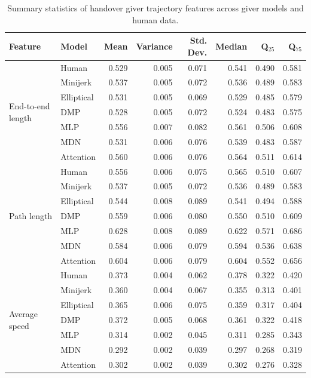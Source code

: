 \documentclass[journal]{IEEEtran}
\begin{document}
\begin{table}[th]
\centering
\caption{Summary statistics of handover giver trajectory features across giver models and human data.}
\label{tab:giver_feature_stats}
\begin{tabular}{llrrrrrr}
\toprule
Feature & Model & Mean & Variance & Std. Dev. & Median & Q$_{25}$ & Q$_{75}$ \\
\midrule
\multirow{7}{*}{End-to-end length}
 & Human & 0.529 & 0.005 & 0.071 & 0.541 & 0.490 & 0.581 \\
 & Minijerk & 0.537 & 0.005 & 0.072 & 0.536 & 0.489 & 0.583 \\
 & Elliptical & 0.531 & 0.005 & 0.069 & 0.529 & 0.485 & 0.579 \\
 & DMP & 0.528 & 0.005 & 0.072 & 0.524 & 0.483 & 0.575 \\
 & MLP & 0.556 & 0.007 & 0.082 & 0.561 & 0.506 & 0.608 \\
 & MDN & 0.531 & 0.006 & 0.076 & 0.539 & 0.483 & 0.587 \\
 & Attention & 0.560 & 0.006 & 0.076 & 0.564 & 0.511 & 0.614 \\
\midrule
\multirow{7}{*}{Path length}
 & Human & 0.556 & 0.006 & 0.075 & 0.565 & 0.510 & 0.607 \\
 & Minijerk & 0.537 & 0.005 & 0.072 & 0.536 & 0.489 & 0.583 \\
 & Elliptical & 0.544 & 0.008 & 0.089 & 0.541 & 0.494 & 0.588 \\
 & DMP & 0.559 & 0.006 & 0.080 & 0.550 & 0.510 & 0.609 \\
 & MLP & 0.628 & 0.008 & 0.089 & 0.622 & 0.571 & 0.686 \\
 & MDN & 0.584 & 0.006 & 0.079 & 0.594 & 0.536 & 0.638 \\
 & Attention & 0.604 & 0.006 & 0.079 & 0.604 & 0.552 & 0.656 \\
\midrule
\multirow{7}{*}{Average speed}
 & Human & 0.373 & 0.004 & 0.062 & 0.378 & 0.322 & 0.420 \\
 & Minijerk & 0.360 & 0.004 & 0.067 & 0.355 & 0.313 & 0.401 \\
 & Elliptical & 0.365 & 0.006 & 0.075 & 0.359 & 0.317 & 0.404 \\
 & DMP & 0.372 & 0.005 & 0.068 & 0.361 & 0.322 & 0.418 \\
 & MLP & 0.314 & 0.002 & 0.045 & 0.311 & 0.285 & 0.343 \\
 & MDN & 0.292 & 0.002 & 0.039 & 0.297 & 0.268 & 0.319 \\
 & Attention & 0.302 & 0.002 & 0.039 & 0.302 & 0.276 & 0.328 \\

\end{tabular}
\end{table}
\end{document}
